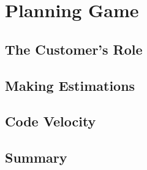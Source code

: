 \section{Planning Game}

\subsection{The Customer's Role}

\subsection{Making Estimations}

\subsection{Code Velocity}

\subsection{Summary}
